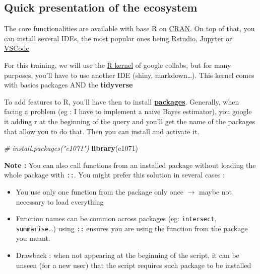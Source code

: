 \documentclass[
]{book}
\newenvironment{Shaded}{\begin{snugshade}}{\end{snugshade}}
\newcommand{\CommentTok}[1]{\textcolor[rgb]{0.56,0.35,0.01}{\textit{#1}}}
\newcommand{\KeywordTok}[1]{\textcolor[rgb]{0.13,0.29,0.53}{\textbf{#1}}}
\newcommand{\NormalTok}[1]{#1}
\providecommand{\tightlist}{%
  \setlength{\itemsep}{0pt}\setlength{\parskip}{0pt}}
\begin{document}
\hypertarget{quick-presentation-of-the-ecosystem}{%
\subsection{Quick presentation of the ecosystem}\label{quick-presentation-of-the-ecosystem}}

The core functionalities are available with base R on \href{https://cran.r-project.org/}{CRAN}. On top of that, you can install several IDEs, the most popular ones being \href{https://rstudio.com/}{Rstudio}, \href{https://jupyter.org/}{Jupyter} or \href{https://code.visualstudio.com/}{VSCode}

For this training, we will use the \href{https://colab.research.google.com/\#create=true\&language=r}{R kernel} of google collabs, but for many purposes, you'll have to use another IDE (shiny, markdown\ldots). This kernel comes with basics packages AND the \textbf{tidyverse}

To add features to R, you'll have then to install \href{https://cran.r-project.org/}{\textbf{packages}}. Generally, when facing a problem (eg : I have to implement a naive Bayes estimator), you google it adding r at the beginning of the query and you'll get the name of the packages that allow you to do that. Then you can install and activate it.

\begin{Shaded}
\begin{Highlighting}[]
\CommentTok{# install.packages("e1071")}
\KeywordTok{library}\NormalTok{(e1071)}
\end{Highlighting}
\end{Shaded}

\textbf{Note :} You can also call functions from an installed package without loading the whole package with \texttt{::}. You might prefer this solution in several cases :

\begin{itemize}
\tightlist
\item
  You use only one function from the package only once \(\rightarrow\) maybe not necessary to load everything
\item
  Function names can be common across packages (eg: \texttt{intersect}, \texttt{summarise}\ldots) using \texttt{::} ensures you are using the function from the package you meant.
\item
  Drawback : when not appearing at the beginning of the script, it can be unseen (for a new user) that the script requires such package to be installed
\end{itemize}
\end{document}
